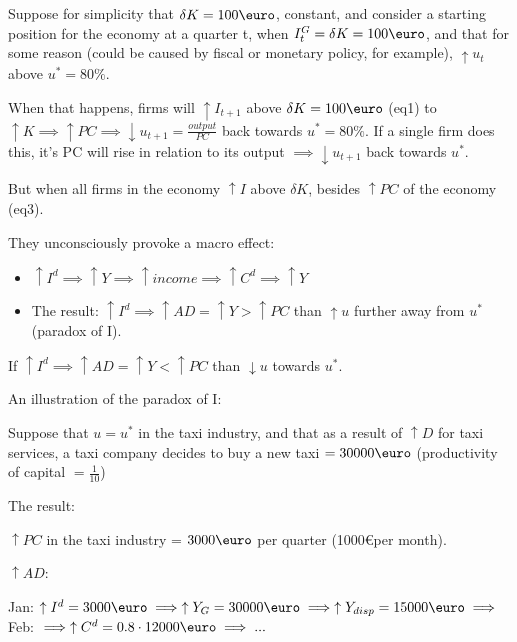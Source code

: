 \documentclass{report}
\begin{document}
Suppose for simplicity that $\delta K=100\text{\euro}$, constant, and consider a starting position for the economy at a quarter t, when $I^G_t=\delta K=100\text{\euro}$, and that for some reason (could be caused by fiscal or monetary policy, for example), $\uparrow u_t$ above $u^*=80\%$.

When that happens, firms will $\uparrow I_{t+1}$ above $\delta K=100 \text{\euro}$ (eq1) to $\uparrow K \implies \uparrow PC \implies \downarrow u_{t+1}=\frac{output}{PC}$ back towards $u^*=80\%$. If a single firm does this, it's PC will rise in relation to its output $\implies \downarrow u_{t+1}$ back towards $u^*$. 

But when all firms in the economy $\uparrow I$ above $\delta K$, besides $\uparrow PC$ of the economy (eq3).

They unconsciously provoke a macro effect: 
\begin{itemize}
        \item 
$\uparrow I^d \implies \uparrow Y \implies \uparrow income \implies \uparrow C^d \implies \uparrow Y$
           \item 
 The result: $\uparrow I^d \implies \uparrow AD =\uparrow Y>\uparrow PC$ than $\uparrow u$ further away from $u^*$ (paradox of I).
\end{itemize}


If $\uparrow I^d \implies \uparrow AD=\uparrow Y < \uparrow PC$ than $\downarrow u$ towards $u^*$. 

An illustration of the paradox of I: 

\begin{description}
    \item Suppose that $u=u^*$ in the taxi industry, and that as a result of $\uparrow D$ for taxi services, a taxi company decides to buy a new taxi $=30000\text{\euro}$ (productivity of capital $=\frac{1}{10}$)
    \item The result:
    \begin{description}
        \item $\uparrow PC$ in the taxi industry = $3000 \text{\euro}$ per quarter (1000\euro per month).
        \item $\uparrow AD$:
        \begin{description}
            \item Jan: $\uparrow I^d=3000\text{\euro} \implies \uparrow Y_G=30000\text{\euro} \implies \uparrow Y_{disp}=15000\text{\euro} \implies$ Feb: $\implies \uparrow C^d=0.8\cdot 12000 \text{\euro}\implies ...$ 
        \end{description}
    \end{description}
\end{description}
\end{document}
